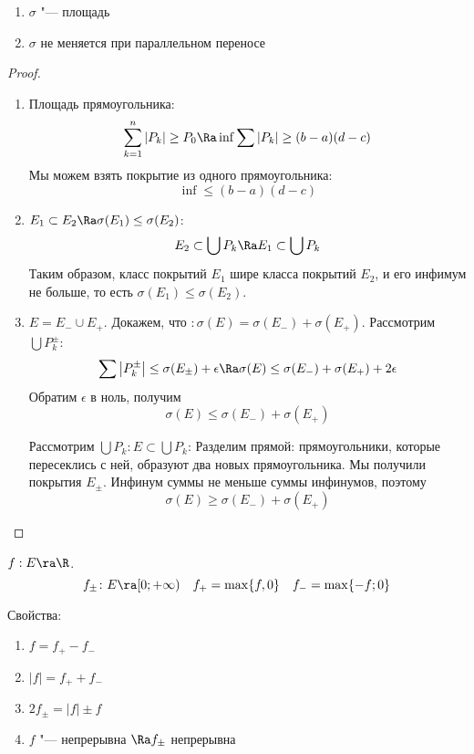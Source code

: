 \begin{theorem}
	\begin{enumerate}
		\item $\sigma$ "--- площадь
		\item $\sigma$ не меняется при параллельном переносе
	\end{enumerate}
\end{theorem}
\begin{proof}
	\begin{enumerate}
	\item
		Площадь прямоугольника:
		\[ \sum_{k = 1}^n |P_k| \ge P_0 \Ra \inf{\sum|P_k|} \ge (b - a)(d - c) \]
		Мы можем взять покрытие из одного прямоугольника:
		\[ \inf \le (b - a)(d - c) \]

	\item
		$E_1 \subset E_2 \Ra \sigma(E_1) \le \sigma(E_2)$:
		\[ E_2 \subset \bigcup P_k \Ra E_1 \subset \bigcup P_k  \]
		Таким образом, класс покрытий $E_1$ шире класса покрытий $E_2$, и его инфимум не больше, то есть $\sigma(E_1) \le \sigma(E_2)$.

	\item
		$E = E_{-} \cup E_{+}$. Докажем, что $\colon \sigma(E) = \sigma(E_{-}) + \sigma(E_{+})$.
		Рассмотрим $\bigcup P_k^{\pm}$:
		\[ \sum \left|P_k^{\pm}\right| \le \sigma(E_{\pm}) + \epsilon \Ra \sigma(E) \le \sigma(E_{-}) + \sigma(E_{+}) + 2\epsilon \]
		Обратим $\epsilon$ в ноль, получим
		\[ \sigma(E) \le \sigma(E_{-}) + \sigma(E_{+}) \]

		Рассмотрим $\bigcup P_k\colon E \subset \bigcup P_k$:
		Разделим прямой: прямоугольники, которые пересеклись с ней, образуют два новых прямоугольника. Мы получили покрытия $E_{\pm}$.
		Инфинум суммы не меньше суммы инфинумов, поэтому
		\[ \sigma(E) \ge \sigma(E_{-}) + \sigma(E_{+}) \]
	\end{enumerate}
\end{proof}

\begin{Def}
	$f: E \ra \R$.
	\[ f_\pm\colon E \ra [0; +\infty) \quad f_+ = \max\{f, 0\} \quad f_- = \max \{-f; 0\} \]
\end{Def}
Свойства:
\begin{enumerate}
	\item $f = f_+ - f_- $
	\item $|f| = f_+ + f_- $
	\item $2f_\pm = |f| \pm f$
	\item $f$ "--- непрерывна $ \Ra f_\pm $ непрерывна
\end{enumerate}

